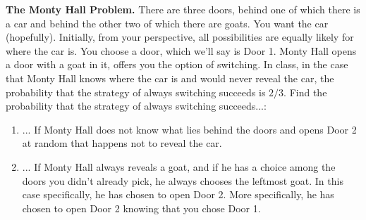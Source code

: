 \documentclass[11pt]{article}
\theoremstyle{definition}
\theoremstyle{remark}
\begin{document}
\newpage

\example \textbf{The Monty Hall Problem.} There are three doors, behind one of which there is a car and behind the other two of which there are goats. You want the car (hopefully). Initially, from your perspective, all possibilities are equally likely for where the car is. You choose a door, which we'll say is Door 1. Monty Hall opens a door with a goat in it, offers you the option of switching. In class, in the case that Monty Hall knows where the car is and would never reveal the car, the probability that the strategy of always switching succeeds is $2/3$. Find the probability that the strategy of always switching succeeds...:
\begin{enumerate} 
         \item ... If Monty Hall does not know what lies behind the doors and opens Door 2 at random that happens not to reveal the car.
         
         
         \item ... If Monty Hall always reveals a goat, and if he has a choice among the doors you didn't already pick, he always chooses the leftmost goat. In this case specifically, he has chosen to open Door 2. More specifically, he has chosen to open Door 2 knowing that you chose Door 1.
         

\end{enumerate}
\vskip 0.5in
\end{document}
